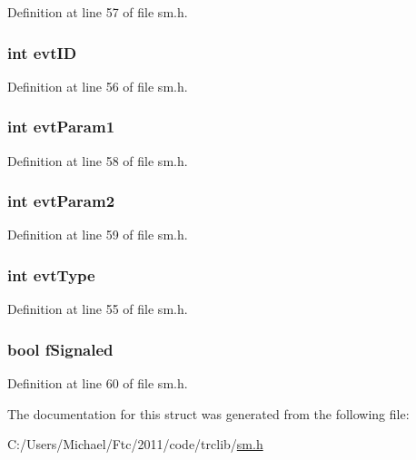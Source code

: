 Definition at line 57 of file sm.h.

\hypertarget{struct_w_a_i_t___e_v_t_a8a07067cf3aa2e373d847ea8ee3024b4}{
\subsubsection[{evtID}]{\setlength{\rightskip}{0pt plus 5cm}int {\bf evtID}}}
\label{struct_w_a_i_t___e_v_t_a8a07067cf3aa2e373d847ea8ee3024b4}


Definition at line 56 of file sm.h.

\hypertarget{struct_w_a_i_t___e_v_t_a34a60177e5f7c11456362e94718087c1}{
\subsubsection[{evtParam1}]{\setlength{\rightskip}{0pt plus 5cm}int {\bf evtParam1}}}
\label{struct_w_a_i_t___e_v_t_a34a60177e5f7c11456362e94718087c1}


Definition at line 58 of file sm.h.

\hypertarget{struct_w_a_i_t___e_v_t_a19252a0b84c2fe22623226e6a1f5d587}{
\subsubsection[{evtParam2}]{\setlength{\rightskip}{0pt plus 5cm}int {\bf evtParam2}}}
\label{struct_w_a_i_t___e_v_t_a19252a0b84c2fe22623226e6a1f5d587}


Definition at line 59 of file sm.h.

\hypertarget{struct_w_a_i_t___e_v_t_af779e05b97b617b213985a1eb1dad15c}{
\subsubsection[{evtType}]{\setlength{\rightskip}{0pt plus 5cm}int {\bf evtType}}}
\label{struct_w_a_i_t___e_v_t_af779e05b97b617b213985a1eb1dad15c}


Definition at line 55 of file sm.h.

\hypertarget{struct_w_a_i_t___e_v_t_a2ca427bbef249aafb0d2f944df33a74f}{
\subsubsection[{fSignaled}]{\setlength{\rightskip}{0pt plus 5cm}bool {\bf fSignaled}}}
\label{struct_w_a_i_t___e_v_t_a2ca427bbef249aafb0d2f944df33a74f}


Definition at line 60 of file sm.h.



The documentation for this struct was generated from the following file:\begin{DoxyCompactItemize}
\item 
C:/Users/Michael/Ftc/2011/code/trclib/\hyperlink{sm_8h}{sm.h}\end{DoxyCompactItemize}

